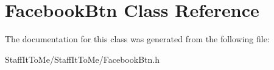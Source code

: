 \hypertarget{interface_facebook_btn}{
\section{\-Facebook\-Btn \-Class \-Reference}
\label{interface_facebook_btn}
}


\-The documentation for this class was generated from the following file\-:\begin{DoxyCompactItemize}
\item 
\-Staff\-It\-To\-Me/\-Staff\-It\-To\-Me/\-Facebook\-Btn.\-h\end{DoxyCompactItemize}
